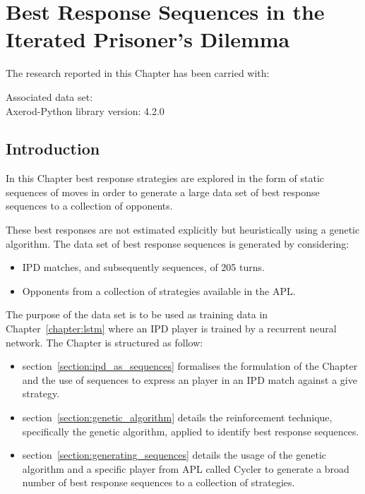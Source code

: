 \chapter{Best Response Sequences in the Iterated Prisoner's Dilemma}\label{chapter:best_response_sequence}

\begin{center}
    The research reported in this Chapter has been carried with:

    Associated data set: \cite{Glynatsi2020_sequences} \\
    Axerod-Python library version: 4.2.0 \\ \vspace{.5cm}
\end{center}

\section{Introduction}

In this Chapter best response strategies are explored in the form
of static sequences of moves in order to generate a large data set of best
response sequences to a collection of opponents.

These best responses are not estimated explicitly but heuristically using a genetic
algorithm. The data set of best response sequences is generated by considering:

\begin{itemize}
    \item IPD matches, and subsequently sequences, of 205 turns.
    \item Opponents from a collection of \numberofstrategiesbestsequences strategies
    available in the APL.
\end{itemize}

The purpose of the data set is to be used as training data in
Chapter~\ref{chapter:lstm} where an IPD player is trained by a recurrent neural
network. The Chapter is structured as follow:

\begin{itemize}
    \item section~\ref{section:ipd_as_sequences} formalises the formulation of
    the Chapter and the use of sequences to express an player in an IPD match
    against a give strategy.
    \item section~\ref{section:genetic_algorithm} details the reinforcement
    technique, specifically the genetic algorithm, applied to identify best response
    sequences.
    \item section~\ref{section:generating_sequences} details the usage of the
    genetic algorithm and a specific player from APL called Cycler to generate a
    broad number of best response sequences to a collection of
    \numberofstrategiesbestsequences strategies.
\end{itemize}

